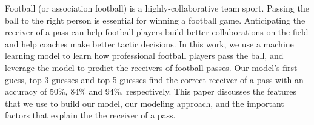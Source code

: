 Football (or association football) is a highly-collaborative team sport. 
Passing the ball to the right person is essential for winning a football game.
Anticipating the receiver of a pass can help football players build better collaborations on the field and help coaches make better tactic decisions.
In this work, we use a machine learning model to learn how professional football players pass the ball, and leverage the model to predict the receivers of football passes.
Our model's first guess, top-3 guesses and top-5 guesses find the correct receiver of a pass with an accuracy of 50\%, 84\% and 94\%, respectively.
This paper discusses the features that we use to build our model, our modeling approach, and the important factors that explain the the receiver of a pass.
